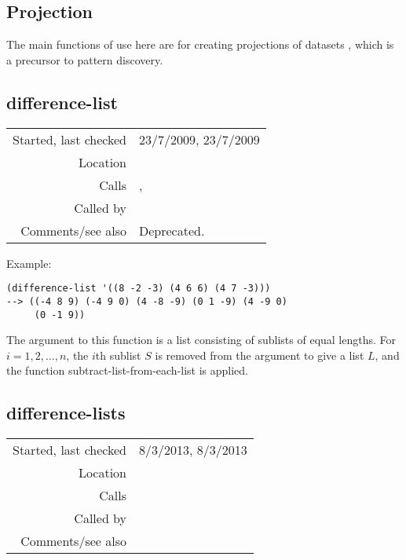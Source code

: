 \subsection{Projection}\label{sec:projection}

The main functions of use here are for creating
projections of datasets \citep{meredith2002}, which
is a precursor to pattern discovery.


\subsection*{difference-list}\label{fun:difference-list}

\vspace{0.3cm}
\begin{tabular}{r|p{8cm}}
Started, last checked & 23/7/2009, 23/7/2009 \\
Location & \nameref{sec:projection} \\
Calls & \nameref{fun:remove-nth}, \nameref{fun:subtract-list-from-each-list} \\
Called by & \\
Comments/see also & Deprecated.
\end{tabular}

\vspace{0.5cm}
\noindent Example:
\begin{verbatim}
(difference-list '((8 -2 -3) (4 6 6) (4 7 -3)))
--> ((-4 8 9) (-4 9 0) (4 -8 -9) (0 1 -9) (4 -9 0)
     (0 -1 9))
\end{verbatim}

\noindent The argument to this function is a list
consisting of sublists of equal lengths. For
$i = 1, 2,\ldots, n$, the $i$th sublist $S$ is removed
from the argument to give a list $L$, and the function
subtract-list-from-each-list is applied.


\subsection*{difference-lists}\label{fun:difference-lists}

\vspace{0.3cm}
\begin{tabular}{r|p{8cm}}
Started, last checked & 8/3/2013, 8/3/2013 \\
Location & \nameref{sec:projection} \\
Calls & \nameref{fun:subtract-two-lists} \\
Called by & \nameref{fun:most-frequent-difference-vector} \\
Comments/see also & 
\end{tabular}

